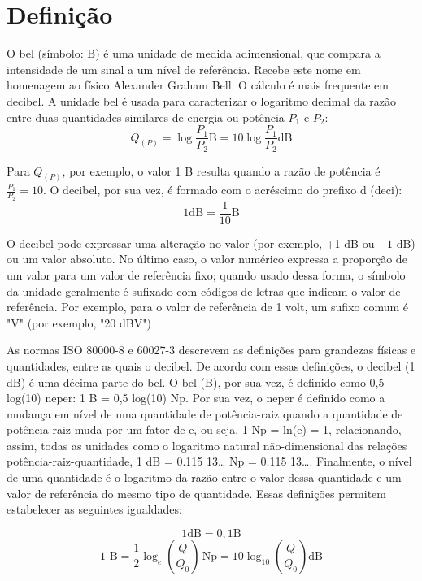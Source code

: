 \section{Definição}
    O bel (símbolo: B) é uma unidade de medida adimensional, que compara a intensidade de um sinal a um nível de referência. Recebe este nome em homenagem ao físico Alexander Graham Bell. O cálculo é mais frequente em decibel. \cite{wiki:xxx}
    A unidade bel é usada para caracterizar o logaritmo decimal da razão entre duas quantidades similares de energia ou potência $P_1$ e $P_2$:
    \begin{equation*}
        Q_{(P)} = \log \frac{P_{1}}{P_{2}} \mathrm{B} = 10 \log \frac{P_{1}}{P_{2}} \mathrm{dB}
    \end{equation*}

    Para ${Q_{(P)}}$, por exemplo, o valor 1 B resulta quando a razão de potência é ${\frac{P_{1}}{P_{2}}} = 10 $. O decibel, por sua vez, é formado com o acréscimo do prefixo d (deci): 
    \begin{equation*}
        1 \mathrm {dB} = \frac{1}{10} \mathrm{B}
    \end{equation*}
    
    O decibel pode expressar uma alteração no valor (por exemplo, +1 dB ou $-1$ dB) ou um valor absoluto. No último caso, o valor numérico expressa a proporção de um valor para um valor de referência fixo; quando usado dessa forma, o símbolo da unidade geralmente é sufixado com códigos de letras que indicam o valor de referência. Por exemplo, para o valor de referência de 1 volt, um sufixo comum é "V" (por exemplo, "20 dBV")

    As normas ISO 80000-8 e 60027-3 descrevem as definições para grandezas físicas e quantidades, entre as quais o decibel. De acordo com essas definições, o decibel (1 dB) é uma décima parte do bel. O bel (B), por sua vez, é definido como 0,5 log(10) neper: 1 B = 0,5 log(10) Np. Por sua vez, o neper é definido como a mudança em nível de uma quantidade de potência-raiz quando a quantidade de potência-raiz muda por um fator de e, ou seja, 1 Np = ln(e) = 1, relacionando, assim, todas as unidades como o logaritmo natural não-dimensional das relações potência-raiz-quantidade, 1 dB = 0.115 13… Np = 0.115 13…. Finalmente, o nível de uma quantidade é o logaritmo da razão entre o valor dessa quantidade e um valor de referência do mesmo tipo de quantidade. Essas definições permitem estabelecer as seguintes igualdades:
    
    \begin{equation*}
        1 \mathrm{dB} = 0,1 \mathrm{B}
    \end{equation*}
    \begin{equation*}
        {\displaystyle 1{\text{ B}}={\frac {1}{2}}\log _{e}\left({\frac {Q}{Q_{0}}}\right)\,{\text{Np}}=10\log _{10}\left({\frac {Q}{Q_{0}}}\right) {\text{dB}}}
    \end{equation*}
    
